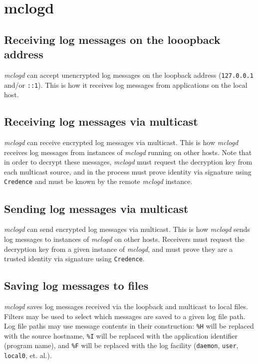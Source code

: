 \chapter{mclogd}

\section{Receiving log messages on the looopback address}
\textit{mclogd} can accept unencrypted log messages on the loopback
address (\texttt{127.0.0.1} and/or \texttt{::1}).  This is how it
receives log messages from applications on the local host.

\section{Receiving log messages via multicast}
\textit{mclogd} can receive encrypted log messages via multicast.
This is how \textit{mclogd} receives log messages from instances of
\textit{mclogd} running on other hosts.  Note that in order to
decrypt these messages, \textit{mclogd} must request the decryption
key from each multicast source, and in the process must prove
identity via signature using \texttt{Credence} and must be known by
the remote \textit{mclogd} instance.

\section{Sending log messages via multicast}
\textit{mclogd} can send encrypted log messages via multicast.
This is how \textit{mclogd} sends log messages to instances of
\textit{mclogd} on other hosts.  Receivers must request the decryption
key from a given instance of \textit{mclogd}, and must prove they
are a trusted identity via signature using \texttt{Credence}.

\section{Saving log messages to files}
\textit{mclogd} saves log messages received via the loopback
and multicast to local files.  Filters may be used to select
which messages are saved to a given log file path.  Log file
paths may use message contents in their construction:
\texttt{\%H} will be replaced with the source hostname,
\texttt{\%I} will be replaced with the application identifier
(program name), and \texttt{\%F} will be replaced with the
log facility (\texttt{daemon}, \texttt{user}, \texttt{local0},
et. al.).
